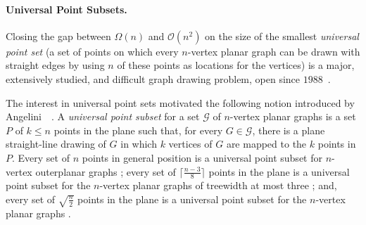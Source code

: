 
 \paragraph{Universal Point Subsets.}%


Closing the gap between $\Omega(n)$ and $\mathcal{O}(n^2)$ on the size of the
smallest \emph{universal point set} (a set of points on which
every $n$-vertex planar graph can be drawn with straight edges by using $n$ of these
points as locations for the vertices) is a major, extensively studied, and difficult graph
drawing problem, open since
$1988$~\cite{%
  dFPP90, DBLP:journals/ipl/Kurowski04, DBLP:journals/jgaa/BannisterCDE14}. 
  
The interest in universal point sets motivated the following notion introduced by Angelini~\etal~\cite{abehlmmo-ups-12}. 
A \emph{universal point subset} for  a set $\mathcal{G}$ of $n$-vertex planar graphs is a
set $P$ of $k\leq n$ points in the plane such that, for every
$G\in\mathcal{G}$, there is a plane straight-line
drawing of $G$ in which $k$ vertices of $G$ are mapped to the $k$
points in $P$. Every set of $n$ points in general position is a
universal point subset for $n$-vertex outerplanar graphs
\cite{GMPP,DBLP:journals/comgeo/Bose02,DBLP:conf/cccg/CastanedaU96};  every
set of $\lceil \frac{n-3}{8}\rceil$ points in the plane is a universal
point subset for the $n$-vertex planar graphs of treewidth at most
three \cite{dalozzo.dujmovic.ea:drawing}; and, every set of $\sqrt{\frac{n}{2}}$ points in the plane is a universal point
subset for the $n$-vertex planar graphs \cite{dujmovic:utility}. 

